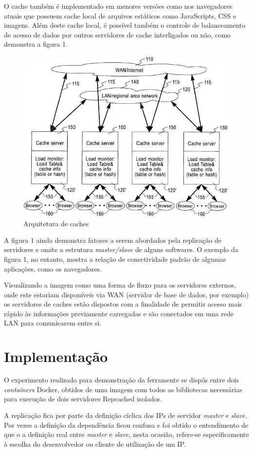 \documentclass[conference]{IEEEtran}
\begin{document}
O cache também é implementado em menores versões como nos navegadores atuais que possuem cache local de arquivos estáticos como JavaScripts, CSS e imagens. Além deste cache local, é possível também o controle de balanceamento de acesso de dados por outros servidores de cache interligados ou não, como demonstra a figura 1.

\begin{figure}[h!]
\centerline{\includegraphics[width=0.7\linewidth]{figura1.png}}
\caption{Arquitetura de caches \cite{cachepatent}}
\label{fig}
\end{figure}

A figura 1 ainda demonstra fatores a serem abordados pela replicação de servidores e omite a estrutura \textit{master/slave} de alguns softwares. O exemplo da figura 1, no entanto, mostra a relação de conectividade padrão de algumas aplicações, como os navegadores. 

Visualizando a imagem como uma forma de fluxo para os servidores externos, onde este estariam disponíveis via WAN (servidor de base de dados, por exemplo) os servidores de caches estão dispostos com a finalidade de permitir acesso mais rápido às informações previamente carregadas e são conectados em uma rede LAN para comunicarem entre si.

\section{Implementação}

O experimento realizado para demonstração da ferramente se dispôs entre dois \textit{containers} Docker\cite{docker}, obtidos de uma imagem com todos as bibliotecas necessárias para execução de dois servidores Repcached \cite{repcached} isolados.

A replicação fica por parte da definição cíclica dos IPs de servidor \textit{master} e \textit{slave}. Por vezes a definição da dependência ficou confusa e foi obtido o entendimento de que o a definição real entre \textit{master} e \textit{slave}, nesta ocasião, refere-se especificamente à escolha do desenvolvedor ou cliente de utilização de um IP.
\end{document}
